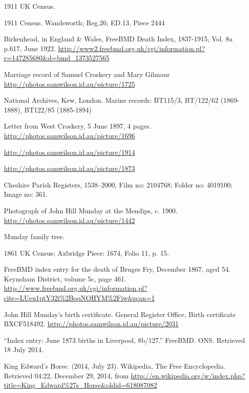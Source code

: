 \begin{thebibliography}{99}
	1911 UK Census.

	1911 Census. Wandsworth; Reg.26; ED.13, Piece 2444

	Birkenhead, in England \& Wales, FreeBMD Death Index, 1837-1915, Vol. 8a p.617, June 1922.
	\url{http://www2.freebmd.org.uk/cgi/information.pl?r=147285680&d=bmd_1373527565}

	Marriage record of Samuel Croskery and Mary Gilmour
	\url{http://photos.samwilson.id.au/picture/1725}

	National Archives, Kew, London.
	Marine records: BT115/3, BT/122/62 (1869-1888), BT122/85 (1885-1894)

	Letter from West Croskery, 5 June 1897, 4 pages.
	\url{http://photos.samwilson.id.au/picture/1696}

	\url{http://photos.samwilson.id.au/picture/1914}

	\url{http://photos.samwilson.id.au/picture/1873}

	Cheshire Parish Registers, 1538--2000, Film no: 2104768; Folder no: 4019100; Image no: 361.

	Photograph of John Hill Munday at the Mendips, c. 1900.
	\url{http://photos.samwilson.id.au/picture/1442}

	Munday family tree.

	1861 UK Census; Axbridge Piece: 1674, Folio 11, p. 15.

	FreeBMD index entry for the death of Bruges Fry, December 1867, aged 54.
	Keynsham District, volume 5c, page 461.
	\url{http://www.freebmd.org.uk/cgi/information.pl?cite=LUeu1ptY32i\%2BoqNOHYM\%2Fiw&scan=1}

	John Hill Munday's birth certificate. General Register Office, Birth certificate BXCF518492.
	\url{http://photos.samwilson.id.au/picture/2031}

	``Index entry: June 1873 births in Liverpool, 8b/127.'' FreeBMD. ONS. Retrieved 18 July 2014.

	King Edward's Horse. (2014, July 23). Wikipedia, The Free Encyclopedia. Retrieved 04:22, December 29, 2014,
	from \url{http://en.wikipedia.org/w/index.php?title=King_Edward\%27s_Horse&oldid=618087082}


\end{thebibliography}
